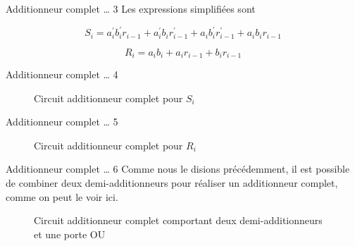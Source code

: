 \documentclass[presentation]{beamer}
\begin{document}
\begin{frame}[label={sec:org6251b19}]{Additionneur complet \ldots{} 3}
Les expressions simplifiées sont 

$$ S_{i} = a_i^\prime b_i^\prime r_{i-1} + a_i^\prime b_i
r_{i-1}^\prime + a_i b_i^\prime r_{i-1}^\prime + a_i b_i r_{i-1} $$

$$ R_{i} = a_i b_i + a_i r_{i-1} + b_i r_{i-1} $$
\end{frame}

\begin{frame}[label={sec:org3ceb24e}]{Additionneur complet \ldots{} 4}
\begin{figure}[htbp]
\centering

\caption{\label{fig:orgb44d512}Circuit additionneur complet pour \(S_i\)}
\end{figure}
\end{frame}

\begin{frame}[label={sec:orgbdb9956}]{Additionneur complet \ldots{} 5}
\begin{figure}[htbp]
\centering

\caption{\label{fig:org2bccd54}Circuit additionneur complet pour \(R_i\)}
\end{figure}
\end{frame}

\begin{frame}[label={sec:org07816a9}]{Additionneur complet \ldots{} 6}
Comme nous le disions précédemment, il est possible de combiner deux
demi-additionneurs pour réaliser un additionneur complet, comme on
peut le voir ici.


\begin{figure}[htbp]
\centering

\caption{\label{fig:org7df972a}Circuit additionneur complet comportant deux demi-additionneurs et une porte OU}
\end{figure}
\end{frame}
\end{document}
